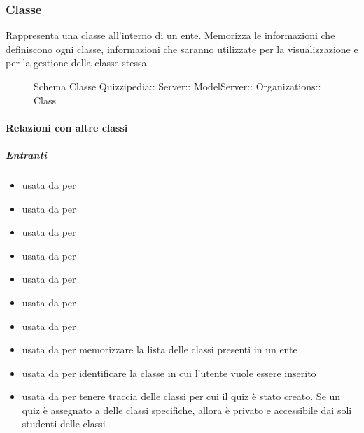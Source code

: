 \subsubsection{Classe }
Rappresenta una classe all'interno di un ente. Memorizza le informazioni che definiscono ogni classe,
informazioni che saranno utilizzate per la visualizzazione e per la gestione della classe stessa.
\begin{figure}[H]
\centering
\noindent{}
\caption[Schema Classe Class]{Schema Classe Quizzipedia:: Server:: ModelServer:: Organizations:: Class}
\end{figure}
\paragraph{Relazioni con altre classi}
\subparagraph{Entranti}
\begin{itemize}
\item usata da  per 
\item usata da  per 
\item usata da  per 
\item usata da  per 
\item usata da  per 
\item usata da  per 
\item usata da  per 
\item usata da  per memorizzare la lista
delle classi presenti in un ente
\item usata da  per identificare la classe
in cui l'utente vuole essere inserito
\item usata da  per tenere traccia delle classi per
cui il quiz è stato creato. Se un quiz è assegnato a delle classi specifiche, allora è privato e
accessibile dai soli studenti delle classi
\end{itemize}
